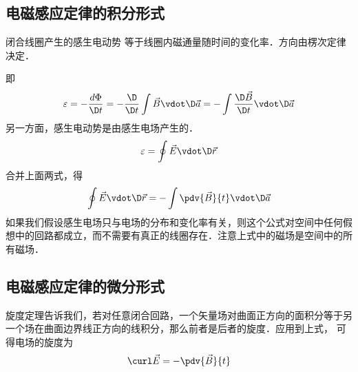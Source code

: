 

\subsection{电磁感应定律的积分形式}

闭合线圈产生的感生电动势%
等于线圈内磁通量随时间的变化率．方向由楞次定律%
决定．

即
\begin{equation}
\varepsilon  =  - \frac{d\Phi }{\D t} =  - \frac{\D }{\D t}\int {\vec B \vdot \D \vec a}  =  - \int {\frac{\D \vec B}{\D t} \vdot \D \vec a} 
\end{equation} 
另一方面，感生电动势是由感生电场产生的． 
\begin{equation}
\varepsilon  = \oint {\vec E \vdot \D \vec r} 
\end{equation} 
合并上面两式，得
\begin{equation}
\oint {\vec E \vdot \D \vec r}  =  - \int {\pdv{\vec B}{t} \vdot \D \vec a} 
\end{equation} 
如果我们假设感生电场只与电场的分布和变化率有关，则这个公式对空间中任何假想中的回路都成立，而不需要有真正的线圈存在．注意上式中的磁场是空间中的所有磁场． 
\subsection{电磁感应定律的微分形式}

旋度定理告诉我们，若对任意闭合回路，一个矢量场对曲面正方向的面积分等于另一个场在曲面边界线正方向的线积分，那么前者是后者的旋度．应用到上式， 可得电场的旋度为
\begin{equation}
\curl \vec E =  - \pdv{\vec B}{t}
\end{equation} 


